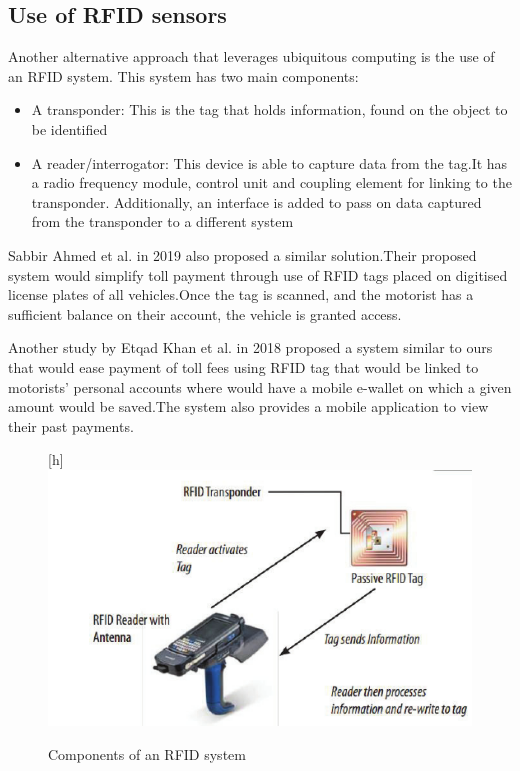 \subsection{Use of RFID sensors}
Another alternative approach that leverages ubiquitous computing is the use of an RFID system. This system has two main components:
\begin{itemize}
    \item A transponder: This is the tag that holds information, found on the object to be identified
    \item A reader/interrogator: This device is able to capture data from the tag.It has a radio frequency module,  control unit and coupling element for linking to the transponder. Additionally, an interface is added to pass on data captured from the transponder to a different system
\end{itemize}


Sabbir Ahmed et al. in 2019 also proposed a similar solution.Their proposed system would simplify toll payment through use of RFID tags placed on digitised license plates of all vehicles.Once the tag is scanned, and the motorist has a sufficient balance on their account, the vehicle is granted access\cite{ahmed_automated_2019}.


Another study by Etqad Khan et al. in 2018 proposed a system similar to ours that would ease payment of toll fees using RFID tag that would be linked to motorists' personal accounts where would have a mobile e-wallet on which a given amount would be saved.The system also provides a mobile application to view their past payments\cite{khan_automated_2018}.

\begin{figure}
    \begin{center}[h]
        \includegraphics[scale = 0.3]{images/rfid-pic}
        \caption{Components of an RFID system}
    \end{center}
\end{figure}

